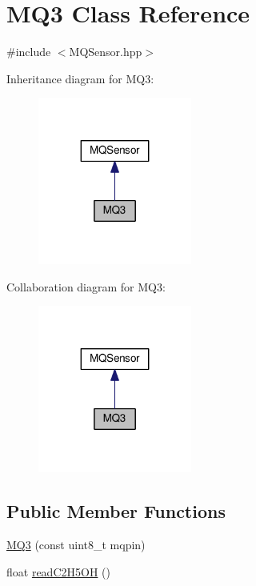 \hypertarget{class_m_q3}{}\section{M\+Q3 Class Reference}
\label{class_m_q3}


{\ttfamily \#include $<$M\+Q\+Sensor.\+hpp$>$}



Inheritance diagram for M\+Q3\+:\nopagebreak
\begin{figure}[H]
\begin{center}
\leavevmode
\includegraphics[width=143pt]{class_m_q3__inherit__graph}
\end{center}
\end{figure}


Collaboration diagram for M\+Q3\+:\nopagebreak
\begin{figure}[H]
\begin{center}
\leavevmode
\includegraphics[width=143pt]{class_m_q3__coll__graph}
\end{center}
\end{figure}
\subsection*{Public Member Functions}
\begin{DoxyCompactItemize}
\item 
\hyperlink{class_m_q3_a6d7d7060e08b946cbb85a5938064d0ae}{M\+Q3} (const uint8\+\_\+t mqpin)
\item 
float \hyperlink{class_m_q3_ab186b1fdf6217d4a175c88c26422138a}{read\+C2\+H5\+OH} ()
\end{DoxyCompactItemize}
